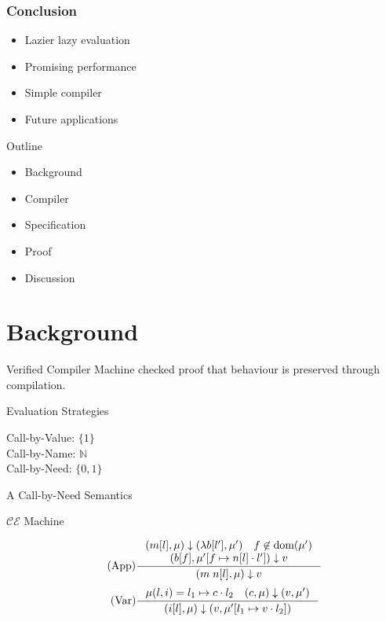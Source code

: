 \documentclass[17pt]{beamer}
\begin{document}
\begin{frame}
\frametitle{Conclusion}
\begin{itemize}
\item Lazier lazy evaluation
\item Promising performance 
\item Simple compiler
\item Future applications
\end{itemize}
\end{frame}

\begin{frame}{Outline}
\begin{itemize}
\item Background
\item Compiler
\item Specification 
\item Proof
\item Discussion
\end{itemize}
\end{frame}
\section{Background}

\begin{frame}{Verified Compiler}
Machine checked proof that behaviour is preserved through compilation.
\end{frame}

\begin{frame}{Evaluation Strategies}
\begin{center}
Call-by-Value: $\{1\}$ \\ 
Call-by-Name: $\mathbb{N}$ \\ 
Call-by-Need: $\{0,1\}$
\end{center}
\end{frame}

\begin{frame}{A Call-by-Need Semantics} 
\begin{center}
\large{$\mathcal{CE}$ Machine}
\end{center}
\begin{align*}
\tag{App} \inference
{(m[l], \mu) \downarrow (\lambda b[l'], \mu') \quad f \not \in \textnormal{dom}(\mu') \\ 
(b[f], \mu'[f \mapsto n[l] \cdot l']) \downarrow v}
{(m \; n[l], \mu) \downarrow v}  
\end{align*}
\begin{align*}
\tag{Var} \inference
{\mu(l, i) = l_1 \mapsto c \cdot l_2 \quad (c, \mu) \downarrow (v, \mu')}
{(i[l],\mu) \downarrow (v, \mu'[l_1 \mapsto v \cdot l_2])}
\end{align*}
\end{frame}
\end{document}
